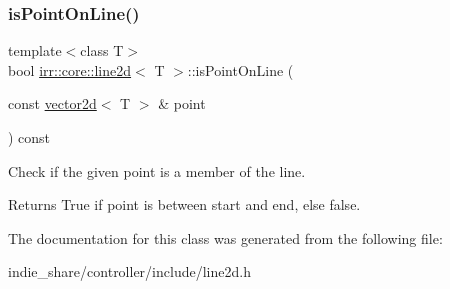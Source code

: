 \subsubsection{\texorpdfstring{is\+Point\+On\+Line()}{isPointOnLine()}\hspace{0.1cm}{\footnotesize\ttfamily [2/2]}}
{\footnotesize\ttfamily template$<$class T$>$ \\
bool \hyperlink{classirr_1_1core_1_1line2d}{irr\+::core\+::line2d}$<$ T $>$\+::is\+Point\+On\+Line (\begin{DoxyParamCaption}\item[{const \hyperlink{classirr_1_1core_1_1vector2d}{vector2d}$<$ T $>$ \&}]{point }\end{DoxyParamCaption}) const\hspace{0.3cm}{\ttfamily [inline]}}



Check if the given point is a member of the line. 

\begin{DoxyReturn}{Returns}
True if point is between start and end, else false. 
\end{DoxyReturn}


The documentation for this class was generated from the following file\+:\begin{DoxyCompactItemize}
\item 
indie\+\_\+share/controller/include/line2d.\+h\end{DoxyCompactItemize}
